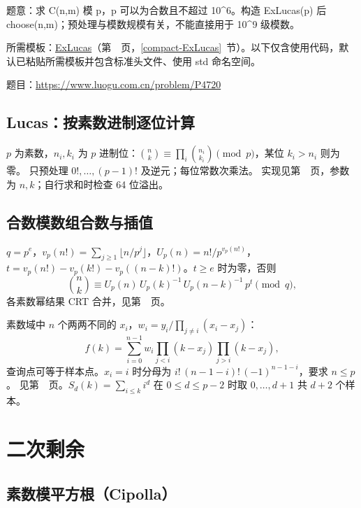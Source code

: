 \label{usage-example-41}

题意：求 C(n,m) 模 p，p 可以为合数且不超过 10\textasciicircum{}6。构造 ExLucas(p) 后 choose(n,m)；预处理与模数规模有关，不能直接用于 10\textasciicircum{}9 级模数。

所需模板：\hyperref[compact-ExLucas]{ExLucas}（第~\pageref{compact-ExLucas}~页，\ref{compact-ExLucas}~节）。以下仅含使用代码，默认已粘贴所需模板并包含标准头文件、使用 std 命名空间。

题目：\url{https://www.luogu.com.cn/problem/P4720}



\subsection{Lucas：按素数进制逐位计算}\label{knowledge-lucas}
$p$ 为素数，$n_i,k_i$ 为 $p$ 进制位：$\binom nk\equiv\prod_i\binom{n_i}{k_i}\pmod p$，某位 $k_i>n_i$ 则为零。
只预处理 $0!,\ldots,(p-1)!$ 及逆元；每位常数次乘法。
实现见第~\pageref{compact-Lucas}~页，参数为 $n,k$；自行求和时检查 64 位溢出。



\subsection{合数模数组合数与插值}\label{knowledge-exlucas}
$q=p^e$，$v_p(n!)=\sum_{j\ge1}\lfloor n/p^j\rfloor$，$U_p(n)=n!/p^{v_p(n!)}$，
$t=v_p(n!)-v_p(k!)-v_p((n-k)!)$。$t\ge e$ 时为零，否则
\[
\binom nk\equiv U_p(n)\,U_p(k)^{-1}\,U_p(n-k)^{-1}\,p^t\pmod q,
\]
各素数幂结果 CRT 合并，见第~\pageref{compact-ExLucas}~页。

素数域中 $n$ 个两两不同的 $x_i$，$w_i=y_i/\prod_{j\ne i}(x_i-x_j)$：
\[
f(k)=\sum_{i=0}^{n-1}w_i\prod_{j<i}(k-x_j)\prod_{j>i}(k-x_j),
\]
查询点可等于样本点。$x_i=i$ 时分母为 $i!\,(n-1-i)!\,(-1)^{n-1-i}$，要求 $n\le p$。
见第~\pageref{compact-Lagrange}~页。$S_d(k)=\sum_{i\le k}i^d$ 在 $0\le d\le p-2$ 时取 $0,\ldots,d+1$ 共 $d+2$ 个样本。



\Needspace{180pt}

\section{二次剩余}

\subsection{素数模平方根（Cipolla）}\label{compact-mod_sqrt}

